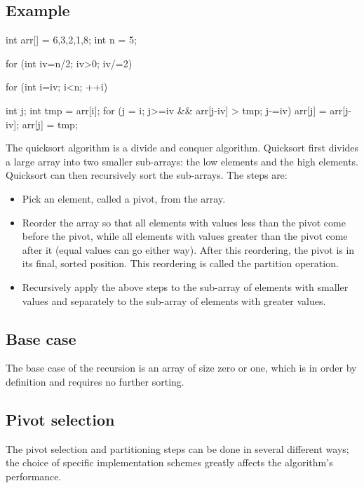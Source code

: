 \documentclass{report}
\begin{document}
    \subsection{Example}
    \bigbreak \noindent 
    \begin{cppcode}
    int arr[] = {6,3,2,1,8};
    int n = 5;

    for (int iv=n/2; iv>0; iv/=2) {

        for (int i=iv; i<n; ++i) {

            int j;
            int tmp = arr[i];
            for (j = i; j>=iv && arr[j-iv] > tmp; j-=iv) {
                arr[j] = arr[j-iv];
            }
            arr[j] = tmp;
        }
    }
    \end{cppcode}

    \pagebreak 
    \bigbreak \noindent 
    \begin{concept}
        The quicksort algorithm is a divide and conquer algorithm. Quicksort first divides a large array into two smaller sub-arrays: the low elements and the high elements. Quicksort can then recursively sort the sub-arrays. The steps are:
    \end{concept}
    \begin{itemize}
        \item Pick an element, called a pivot, from the array.
        \item Reorder the array so that all elements with values less than the pivot come before the pivot, while all elements with values greater than the pivot come after it (equal values can go either way). After this reordering, the pivot is in its final, sorted position. This reordering is called the partition operation.
        \item Recursively apply the above steps to the sub-array of elements with smaller values and separately to the sub-array of elements with greater values.
    \end{itemize}
    \bigbreak \noindent 
    \subsection{Base case}
    \bigbreak \noindent 
    The base case of the recursion is an array of size zero or one, which is in order by definition and requires no further sorting.
    \bigbreak \noindent 
    \subsection{Pivot selection}
    \bigbreak \noindent The pivot selection and partitioning steps can be done in several different ways; the choice of specific implementation schemes greatly affects the algorithm's performance.
\end{document}
